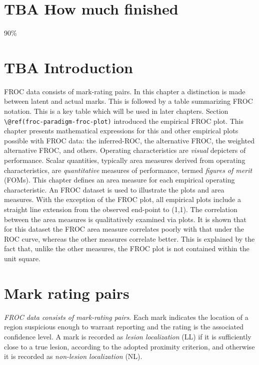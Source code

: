 \documentclass[
]{book}
\begin{document}
\hypertarget{empirical-how-much-finished}{%
\section{TBA How much finished}\label{empirical-how-much-finished}}

90\%

\hypertarget{empirical-intro}{%
\section{TBA Introduction}\label{empirical-intro}}

FROC data consists of mark-rating pairs. In this chapter a distinction is made between latent and actual marks. This is followed by a table summarizing FROC notation. This is a key table which will be used in later chapters. Section \texttt{\textbackslash{}@ref(froc-paradigm-froc-plot)} introduced the empirical FROC plot. This chapter presents mathematical expressions for this and other empirical plots possible with FROC data: the inferred-ROC, the alternative FROC, the weighted alternative FROC, and others. Operating characteristics are \emph{visual} depicters of performance. Scalar quantities, typically area measures derived from operating characteristics, are \emph{quantitative} measures of performance, termed \emph{figures of merit} (FOMs). This chapter defines an area measure for each empirical operating characteristic. An FROC dataset is used to illustrate the plots and area measures. With the exception of the FROC plot, all empirical plots include a straight line extension from the observed end-point to (1,1). The correlation between the area measures is qualitatively examined via plots. It is shown that for this dataset the FROC area measure correlates poorly with that under the ROC curve, whereas the other measures correlate better. This is explained by the fact that, unlike the other measures, the FROC plot is not contained within the unit square.

\hypertarget{empirical-mark-rating-pairs}{%
\section{Mark rating pairs}\label{empirical-mark-rating-pairs}}

\emph{FROC data consists of mark-rating pairs}. Each mark indicates the location of a region suspicious enough to warrant reporting and the rating is the associated confidence level. A mark is recorded as \emph{lesion localization} (LL) if it is sufficiently close to a true lesion, according to the adopted proximity criterion, and otherwise it is recorded as \emph{non-lesion localization} (NL).
\end{document}
